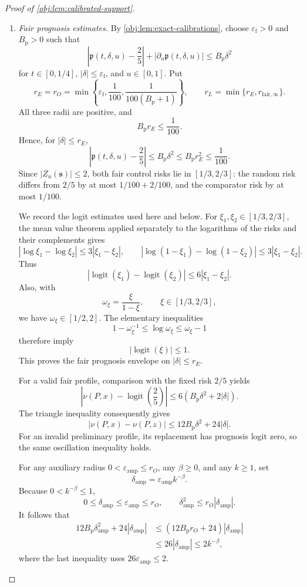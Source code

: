 \documentclass[11pt]{article}
\begin{document}
\begin{proof}[Proof of \cref{obj:lem:calibrated-support}]
\begin{enumerate}
\item \textit{Fair prognosis estimates.}
By \cref{obj:lem:exact-calibrations}, choose
\(\varepsilon_{\mathrm f}>0\) and \(B_{\mathrm p}>0\) such that
\[
\left|\mathfrak p(t,\delta,u)-\frac25\right|
+\left|\partial_u\mathfrak p(t,\delta,u)\right|
\le B_{\mathrm p}\delta^2
\]
for \(t\in[0,1/4]\), \(|\delta|\le\varepsilon_{\mathrm f}\), and \(u\in[0,1]\).
Put
\[
r_E=r_O
=\min\left\{\varepsilon_{\mathrm f},\frac1{100},
                    \frac1{100(B_{\mathrm p}+1)}\right\},
\qquad
r_L=\min\{r_E,r_{\mathrm{fair},\infty}\}.
\]
All three radii are positive, and
\[
B_{\mathrm p}r_E\le\frac1{100}.
\]
Hence, for \(|\delta|\le r_E\),
\[
\left|\mathfrak p(t,\delta,u)-\frac25\right|
\le B_{\mathrm p}\delta^2
\le B_{\mathrm p}r_E^2
\le\frac1{100}.
\]
Since \(|Z_u(\mathbf s)|\le2\), both fair control risks lie in
\([1/3,2/3]\): the random risk differs from \(2/5\) by at most
\(1/100+2/100\), and the comparator risk by at most \(1/100\).

We record the logit estimates used here and below. For
\(\xi_1,\xi_2\in[1/3,2/3]\), the mean value theorem applied separately to the logarithms of the risks and their complements gives
\[
|\log \xi_1-\log \xi_2|\le3|\xi_1-\xi_2|,
\qquad
|\log(1-\xi_1)-\log(1-\xi_2)|\le3|\xi_1-\xi_2|.
\]
Thus
\[
|\operatorname{logit}(\xi_1)-\operatorname{logit}(\xi_2)|
\le6|\xi_1-\xi_2|.
\]
Also, with
\[
\omega_\xi=\frac{\xi}{1-\xi},
\qquad \xi\in[1/3,2/3],
\]
we have \(\omega_\xi\in[1/2,2]\). The elementary inequalities
\[
1-\omega_\xi^{-1}\le\log\omega_\xi\le\omega_\xi-1
\]
therefore imply
\[
|\operatorname{logit}(\xi)|\le1.
\]
This proves the fair prognosis envelope on \(|\delta|\le r_E\).

For a valid fair profile, comparison with the fixed risk \(2/5\) yields
\[
\left|\nu(P,x)-\operatorname{logit}\!\left(\frac25\right)\right|
\le6(B_{\mathrm p}\delta^2+2|\delta|).
\]
The triangle inequality consequently gives
\[
|\nu(P,x)-\nu(P,z)|
\le12B_{\mathrm p}\delta^2+24|\delta|.
\]
For an invalid preliminary profile, its replacement has prognosis logit zero, so the same oscillation inequality holds.

For any auxiliary radius \(0<\varepsilon_{\mathrm{amp}}\le r_O\), any
\(\beta\ge0\), and any \(k\ge1\), set
\[
\delta_{\mathrm{amp}}
=\varepsilon_{\mathrm{amp}}k^{-\beta}.
\]
Because \(0<k^{-\beta}\le1\),
\[
0\le\delta_{\mathrm{amp}}\le\varepsilon_{\mathrm{amp}}\le r_O,
\qquad
\delta_{\mathrm{amp}}^2\le r_O|\delta_{\mathrm{amp}}|.
\]
It follows that
\[
\begin{aligned}
12B_{\mathrm p}\delta_{\mathrm{amp}}^2
   +24|\delta_{\mathrm{amp}}|
&\le(12B_{\mathrm p}r_O+24)|\delta_{\mathrm{amp}}|\\
&\le26|\delta_{\mathrm{amp}}|
\le2k^{-\beta},
\end{aligned}
\]
where the last inequality uses \(26\varepsilon_{\mathrm{amp}}\le2\).


\end{enumerate}
\end{proof}
\end{document}
